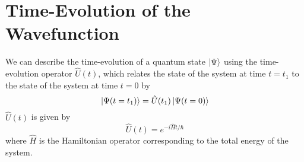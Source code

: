 %
%
%

\section*{Time-Evolution of the Wavefunction}

	We can describe the time-evolution of a quantum state $\ket{\Psi}$ using the time-evolution operator $\hat U (t)$, which relates the state of the system at time $t=t_1$ to the state of the system at time $t=0$ by
	\begin{equation*}
		\ket{\Psi(t=t_1)} = \hat U(t_1) \ket{\Psi(t=0)}
	\end{equation*}
	$\hat U(t)$ is given by 
	\begin{equation*}
		\hat U(t) = e^{-i\hat H t/\hbar}
	\end{equation*}
	where $\hat H$ is the Hamiltonian operator corresponding to the total energy of the system.
	
